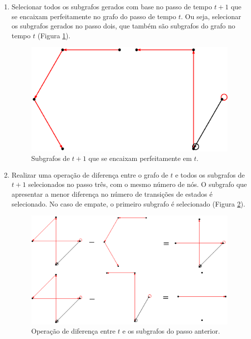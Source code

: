 \documentclass[12pt,a4paper]{article}
\begin{document}
\begin{enumerate}
\item Selecionar todos os subgrafos gerados com base no passo de tempo $t+1$
que se encaixam perfeitamente no grafo do passo de tempo $t$. Ou seja,
selecionar os subgrafos gerados no passo dois, que também são subgrafos do
grafo no tempo $t$ (Figura \ref{fig:selectsubgraph}).

\begin{figure}[H]
\begin{center}
\includegraphics[scale=0.6]{img/SelectSubGraph.eps}
\caption{Subgrafos de $t+1$ que se encaixam perfeitamente em $t$.}
\label{fig:selectsubgraph}
\end{center}
\end{figure}

\item Realizar uma operação de diferença entre o grafo de $t$ e todos os
subgrafos de $t+1$ selecionados no passo três, com o mesmo número de nós. O
subgrafo que apresentar a menor diferença no número de transições de estados
é selecionado. No caso de empate, o primeiro subgrafo é selecionado
(Figura \ref{fig:diffgraph}).

\begin{figure}[H]
\begin{center}
\includegraphics[scale=0.6]{img/DiffGraph.eps}
\caption{Operação de diferença entre $t$ e os subgrafos do passo anterior.}
\label{fig:diffgraph}
\end{center}
\end{figure}

\end{enumerate}
\end{document}
